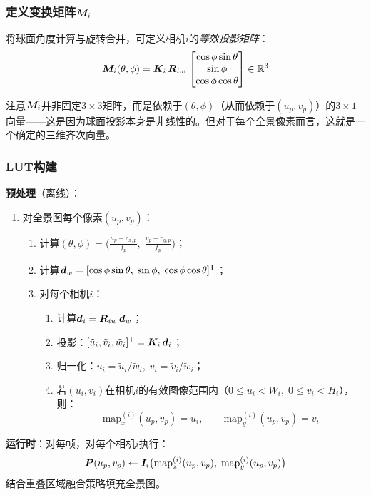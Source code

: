 \subsubsection{定义变换矩阵\texorpdfstring{$\bm{M}_i$}{M\_i}}

将球面角度计算与旋转合并，可定义相机$i$的\emph{等效投影矩阵}：
\begin{equation}
\bm{M}_i(\theta, \phi) = \bm{K}_i\,\bm{R}_{iw}\,
\begin{bmatrix}
\cos\phi\sin\theta \\
\sin\phi \\
\cos\phi\cos\theta
\end{bmatrix}
\in \mathbb{R}^{3}
\label{eq:Mi}
\end{equation}

注意$\bm{M}_i$并非固定$3\times 3$矩阵，而是依赖于$(\theta,\phi)$（从而依赖于$(u_p,v_p)$）的$3\times 1$向量——这是因为球面投影本身是非线性的。但对于每个全景像素而言，这就是一个确定的三维齐次向量。

\subsubsection{LUT构建}

\begin{resultbox}[多相机阵列纯旋转LUT构建算法]
\textbf{预处理}（离线）：
\begin{enumerate}[label=(\arabic*), leftmargin=*]
  \item 对全景图每个像素$(u_p, v_p)$：
  \begin{enumerate}
    \item 计算$(\theta,\phi) = \bigl(\frac{u_p-c_{x,p}}{f_p},\; \frac{v_p-c_{y,p}}{f_p}\bigr)$；
    \item 计算$\bm{d}_w = [\cos\phi\sin\theta,\; \sin\phi,\; \cos\phi\cos\theta]^{\mathsf{T}}$；
    \item 对每个相机$i$：
    \begin{enumerate}
      \item 计算$\bm{d}_i = \bm{R}_{iw}\,\bm{d}_w$；
      \item 投影：$[\tilde{u}_i,\tilde{v}_i,\tilde{w}_i]^{\mathsf{T}} = \bm{K}_i\,\bm{d}_i$；
      \item 归一化：$u_i = \tilde{u}_i/\tilde{w}_i,\; v_i = \tilde{v}_i/\tilde{w}_i$；
      \item 若$(u_i, v_i)$在相机$i$的有效图像范围内（$0 \le u_i < W_i,\; 0 \le v_i < H_i$），则：
      \[
      \text{map}_x^{(i)}(u_p, v_p) = u_i,\qquad
      \text{map}_y^{(i)}(u_p, v_p) = v_i
      \]
    \end{enumerate}
  \end{enumerate}
\end{enumerate}

\textbf{运行时}：对每帧，对每个相机$i$执行：
\[
\bm{P}(u_p,v_p) \leftarrow \bm{I}_i\bigl(\text{map}_x^{(i)}(u_p,v_p),\; \text{map}_y^{(i)}(u_p,v_p)\bigr)
\]
结合重叠区域融合策略填充全景图。
\end{resultbox}

